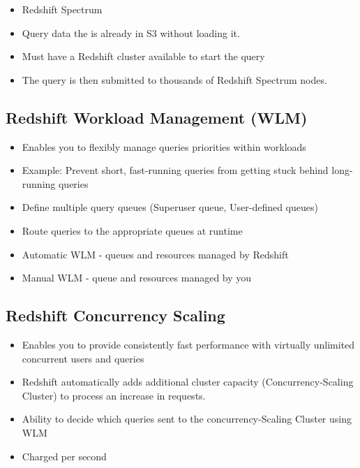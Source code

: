 \begin{itemize}
    \item Redshift Spectrum
    \item Query data the is already in S3 without loading it.
    \item Must have a Redshift cluster available to start the query
    \item The query is then submitted to thousands of Redshift Spectrum nodes.
\end{itemize}

\subsection{Redshift Workload Management (WLM)}
\begin{itemize}
    \item Enables you to flexibly manage queries priorities within workloads
    \item Example: Prevent short, fast-running queries from getting stuck behind long-running queries
    \item Define multiple query queues (Superuser queue, User-defined queues)
    \item Route queries to the appropriate queues at runtime
    \item Automatic WLM - queues and resources managed by Redshift
    \item Manual WLM - queue and resources managed by you
\end{itemize}

\subsection{Redshift Concurrency Scaling}
\begin{itemize}
    \item Enables you to provide consistently fast performance with virtually unlimited concurrent users and queries
    \item Redshift automatically adds additional cluster capacity (Concurrency-Scaling Cluster) to process an increase in requests.
    \item Ability to decide which queries sent to the concurrency-Scaling Cluster using WLM
    \item Charged per second
\end{itemize}


